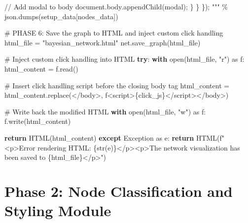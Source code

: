\documentclass[
  11pt,
  letterpaper,
]{book}
\newenvironment{Shaded}{\begin{snugshade}}{\end{snugshade}}
\newcommand{\BuiltInTok}[1]{\textcolor[rgb]{0.00,0.23,0.31}{#1}}
\newcommand{\CommentTok}[1]{\textcolor[rgb]{0.37,0.37,0.37}{#1}}
\newcommand{\ControlFlowTok}[1]{\textcolor[rgb]{0.00,0.23,0.31}{\textbf{#1}}}
\newcommand{\ImportTok}[1]{\textcolor[rgb]{0.00,0.46,0.62}{#1}}
\newcommand{\NormalTok}[1]{\textcolor[rgb]{0.00,0.23,0.31}{#1}}
\newcommand{\OperatorTok}[1]{\textcolor[rgb]{0.37,0.37,0.37}{#1}}
\newcommand{\PreprocessorTok}[1]{\textcolor[rgb]{0.68,0.00,0.00}{#1}}
\newcommand{\SpecialCharTok}[1]{\textcolor[rgb]{0.37,0.37,0.37}{#1}}
\newcommand{\SpecialStringTok}[1]{\textcolor[rgb]{0.13,0.47,0.30}{#1}}
\newcommand{\StringTok}[1]{\textcolor[rgb]{0.13,0.47,0.30}{#1}}
\begin{document}
\begin{Shaded}
\begin{Highlighting}[]
\StringTok{                // Add modal to body}
\StringTok{                document.body.appendChild(modal);}
\StringTok{            \}}
\StringTok{        \}}
\StringTok{    \});}
\StringTok{    """} \OperatorTok{\%}\NormalTok{ json.dumps(setup\_data[}\StringTok{\textquotesingle{}nodes\_data\textquotesingle{}}\NormalTok{])}

    \CommentTok{\# PHASE 6: Save the graph to HTML and inject custom click handling}
\NormalTok{    html\_file }\OperatorTok{=} \StringTok{"bayesian\_network.html"}
\NormalTok{    net.save\_graph(html\_file)}

    \CommentTok{\# Inject custom click handling into HTML}
    \ControlFlowTok{try}\NormalTok{:}
        \ControlFlowTok{with} \BuiltInTok{open}\NormalTok{(html\_file, }\StringTok{"r"}\NormalTok{) }\ImportTok{as}\NormalTok{ f:}
\NormalTok{            html\_content }\OperatorTok{=}\NormalTok{ f.read()}

        \CommentTok{\# Insert click handling script before the closing body tag}
\NormalTok{        html\_content }\OperatorTok{=}\NormalTok{ html\_content.replace(}\StringTok{\textquotesingle{}\textless{}/body\textgreater{}\textquotesingle{}}\NormalTok{, }\SpecialStringTok{f\textquotesingle{}\textless{}script\textgreater{}}\SpecialCharTok{\{}\NormalTok{click\_js}\SpecialCharTok{\}}\SpecialStringTok{\textless{}/script\textgreater{}\textless{}/body\textgreater{}\textquotesingle{}}\NormalTok{)}

        \CommentTok{\# Write back the modified HTML}
        \ControlFlowTok{with} \BuiltInTok{open}\NormalTok{(html\_file, }\StringTok{"w"}\NormalTok{) }\ImportTok{as}\NormalTok{ f:}
\NormalTok{            f.write(html\_content)}

        \ControlFlowTok{return}\NormalTok{ HTML(html\_content)}
    \ControlFlowTok{except} \PreprocessorTok{Exception} \ImportTok{as}\NormalTok{ e:}
        \ControlFlowTok{return}\NormalTok{ HTML(}\SpecialStringTok{f"\textless{}p\textgreater{}Error rendering HTML: }\SpecialCharTok{\{}\BuiltInTok{str}\NormalTok{(e)}\SpecialCharTok{\}}\SpecialStringTok{\textless{}/p\textgreater{}\textless{}p\textgreater{}The network visualization has been saved to \textquotesingle{}}\SpecialCharTok{\{}\NormalTok{html\_file}\SpecialCharTok{\}}\SpecialStringTok{\textquotesingle{}\textless{}/p\textgreater{}"}\NormalTok{)}
\end{Highlighting}
\end{Shaded}

\section{Phase 2: Node Classification and Styling
Module}\label{phase-2-node-classification-and-styling-module}
\end{document}
